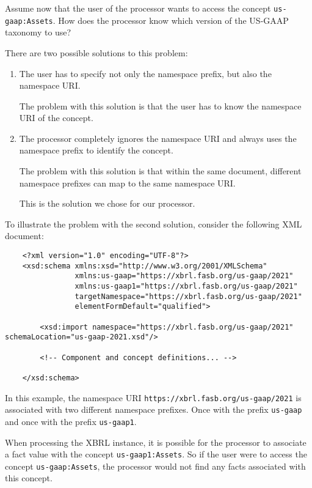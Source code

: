 Assume now that the user of the processor wants to access the concept \texttt{us-gaap:Assets}. 
How does the processor know which version of the US-GAAP taxonomy to use?

There are two possible solutions to this problem:

\begin{enumerate}
    \item The user has to specify not only the namespace prefix, but also the namespace URI. 
    
    The problem with this solution is that the user has to know the namespace URI of the concept.
    \item The processor completely ignores the namespace URI and always uses the namespace prefix to identify the concept. 
    
    The problem with this solution is that within the same document, different namespace prefixes can map to the same namespace URI.

    This is the solution we chose for our processor. 
\end{enumerate}

To illustrate the problem with the second solution, consider the following XML document:

\begin{lstlisting}
    <?xml version="1.0" encoding="UTF-8"?>
    <xsd:schema xmlns:xsd="http://www.w3.org/2001/XMLSchema"
                xmlns:us-gaap="https://xbrl.fasb.org/us-gaap/2021"
                xmlns:us-gaap1="https://xbrl.fasb.org/us-gaap/2021"
                targetNamespace="https://xbrl.fasb.org/us-gaap/2021"
                elementFormDefault="qualified">

        <xsd:import namespace="https://xbrl.fasb.org/us-gaap/2021" schemaLocation="us-gaap-2021.xsd"/>

        <!-- Component and concept definitions... -->

    </xsd:schema>

\end{lstlisting}

In this example, the namespace URI \texttt{https://xbrl.fasb.org/us-gaap/2021} is associated with two different namespace prefixes.
Once with the prefix \texttt{us-gaap} and once with the prefix \texttt{us-gaap1}.

When processing the XBRL instance, it is possible for the processor to associate a fact value with the concept \texttt{us-gaap1:Assets}.
So if the user were to access the concept \texttt{us-gaap:Assets}, the processor would not find any facts associated with this concept.

